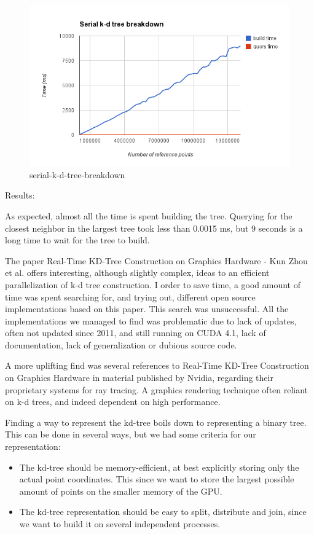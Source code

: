 \begin{figure}[ht!]
\centering
\includegraphics[width=120mm]{../gfx/serial-k-d-tree-breakdown.png}

\caption{serial-k-d-tree-breakdown}
\label{fig:serial_kd_tree_breakdown}
\end{figure}

Results:

As expected, almost all the time is spent building the tree. Querying for the closest neighbor in the largest tree took less than 0.0015 ms, but 9 seconds is a long time to wait for the tree to build.

The paper Real-Time KD-Tree Construction on Graphics Hardware - Kun Zhou et al. offers interesting, although slightly complex, ideas to an efficient parallelization of k-d tree construction. I order to save time, a good amount of time was spent searching for, and trying out, different open source implementations based on this paper. This search was unsuccessful. All the implementations we managed to find was problematic due to lack of updates, often not updated since 2011, and still running on CUDA 4.1, lack of documentation, lack of generalization or dubious source code.

A more uplifting find was several references to Real-Time KD-Tree Construction on Graphics Hardware in material published by Nvidia, regarding their proprietary systems for ray tracing. A graphics rendering technique often reliant on k-d trees, and indeed dependent on high performance.

Finding a way to represent the kd-tree boils down to representing a binary tree. This can be done in several ways, but we had some criteria for our representation:

\begin{itemize}
    \item The kd-tree should be memory-efficient, at best explicitly storing only the actual point coordinates. This since we want to store the largest possible amount of points on the smaller memory of the GPU.
    \item The kd-tree representation should be easy to split, distribute and join, since we want to build it on several independent processes.
\end{itemize}

